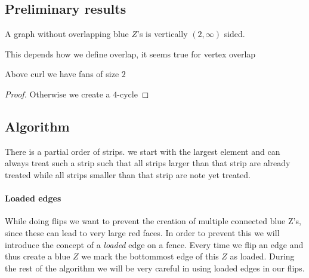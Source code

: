 \subsection{Preliminary results}

\begin{lemma}
  \label{lm:}
  A graph without overlapping blue $Z$'s is vertically $(2, \infty)$ sided.
\end{lemma}
This depends how we define overlap, it seems true for vertex overlap

\begin{lemma}
  \label{lm:}
  Above curl we have fans of size $2$
\end{lemma}
\begin{proof}
  Otherwise we create a $4$-cycle
\end{proof}


\subsection{Algorithm}
There is a partial order of strips. we start with the largest element and can always treat such a strip such that all strips larger than that strip are already treated while all strips smaller than that strip are note yet treated.

\paragraph{Loaded edges}
While doing flips we want to prevent the creation of multiple connected blue Z's, since these can lead to very large red faces. In order to prevent this we will introduce the concept of a \emph{loaded} edge on a fence. Every time we flip an edge and thus create a blue $Z$ we mark the bottommost edge of this $Z$ as loaded. During the rest of the algorithm we will be very careful in using loaded edges in our flips.

